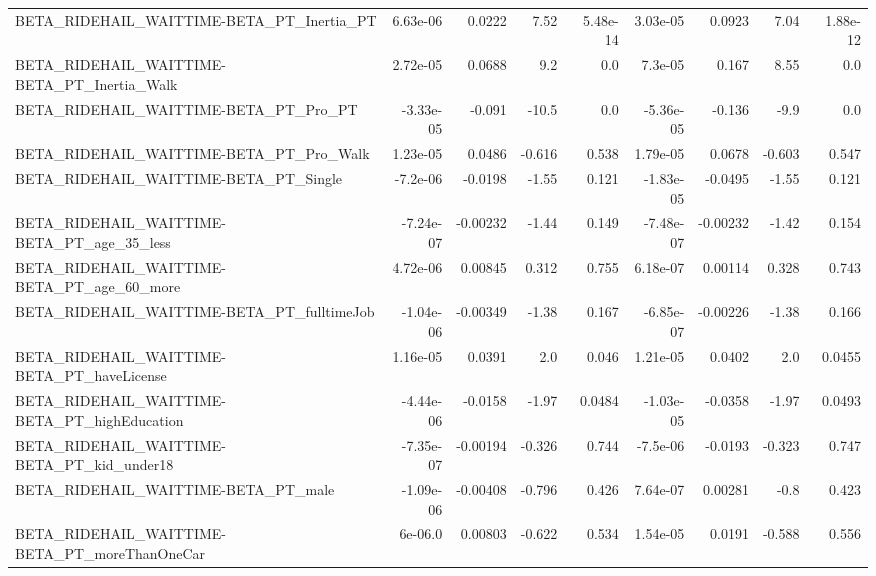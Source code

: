 \begin{tabular}{lrrrrrrrr}
BETA\_RIDEHAIL\_WAITTIME-BETA\_PT\_Inertia\_PT          &    6.63e-06 &       0.0222 &     7.52 & 5.48e-14 &   3.03e-05 &      0.0923 &         7.04 &      1.88e-12 \\
BETA\_RIDEHAIL\_WAITTIME-BETA\_PT\_Inertia\_Walk        &    2.72e-05 &       0.0688 &      9.2 &      0.0 &    7.3e-05 &       0.167 &         8.55 &           0.0 \\
BETA\_RIDEHAIL\_WAITTIME-BETA\_PT\_Pro\_PT              &   -3.33e-05 &       -0.091 &    -10.5 &      0.0 &  -5.36e-05 &      -0.136 &         -9.9 &           0.0 \\
BETA\_RIDEHAIL\_WAITTIME-BETA\_PT\_Pro\_Walk            &    1.23e-05 &       0.0486 &   -0.616 &    0.538 &   1.79e-05 &      0.0678 &       -0.603 &         0.547 \\
BETA\_RIDEHAIL\_WAITTIME-BETA\_PT\_Single              &    -7.2e-06 &      -0.0198 &    -1.55 &    0.121 &  -1.83e-05 &     -0.0495 &        -1.55 &         0.121 \\
BETA\_RIDEHAIL\_WAITTIME-BETA\_PT\_age\_35\_less         &   -7.24e-07 &     -0.00232 &    -1.44 &    0.149 &  -7.48e-07 &    -0.00232 &        -1.42 &         0.154 \\
BETA\_RIDEHAIL\_WAITTIME-BETA\_PT\_age\_60\_more         &    4.72e-06 &      0.00845 &    0.312 &    0.755 &   6.18e-07 &     0.00114 &        0.328 &         0.743 \\
BETA\_RIDEHAIL\_WAITTIME-BETA\_PT\_fulltimeJob         &   -1.04e-06 &     -0.00349 &    -1.38 &    0.167 &  -6.85e-07 &    -0.00226 &        -1.38 &         0.166 \\
BETA\_RIDEHAIL\_WAITTIME-BETA\_PT\_haveLicense         &    1.16e-05 &       0.0391 &      2.0 &    0.046 &   1.21e-05 &      0.0402 &          2.0 &        0.0455 \\
BETA\_RIDEHAIL\_WAITTIME-BETA\_PT\_highEducation       &   -4.44e-06 &      -0.0158 &    -1.97 &   0.0484 &  -1.03e-05 &     -0.0358 &        -1.97 &        0.0493 \\
BETA\_RIDEHAIL\_WAITTIME-BETA\_PT\_kid\_under18         &   -7.35e-07 &     -0.00194 &   -0.326 &    0.744 &   -7.5e-06 &     -0.0193 &       -0.323 &         0.747 \\
BETA\_RIDEHAIL\_WAITTIME-BETA\_PT\_male                &   -1.09e-06 &     -0.00408 &   -0.796 &    0.426 &   7.64e-07 &     0.00281 &         -0.8 &         0.423 \\
BETA\_RIDEHAIL\_WAITTIME-BETA\_PT\_moreThanOneCar      &     6e-06.0 &      0.00803 &   -0.622 &    0.534 &   1.54e-05 &      0.0191 &       -0.588 &         0.556 \\

\end{tabular}
